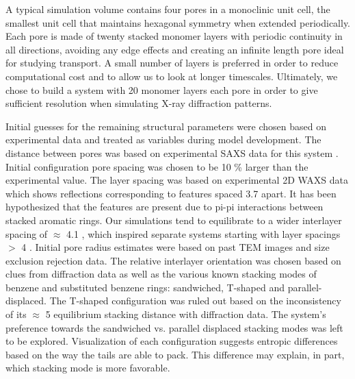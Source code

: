 A typical simulation volume contains four pores in a monoclinic unit cell,
the smallest unit cell that maintains hexagonal symmetry when extended 
periodically. Each pore is made of twenty stacked monomer layers with
periodic continuity in all directions, avoiding any edge effects and 
creating an infinite length pore ideal for studying transport. A small
number of layers is preferred in order to reduce computational cost and 
to allow us to look at longer timescales. Ultimately, we chose to build a system
with 20 monomer layers each pore in order to give sufficient
resolution when simulating X-ray diffraction patterns.  %


Initial guesses for the remaining structural parameters were chosen
based on experimental data and treated as variables during model
development. The distance between pores was based on experimental SAXS
data for this system \cite{feng_thin_2016}. Initial configuration pore
spacing was chosen to be 10 \% larger than the experimental value. 
The layer spacing was based on experimental 2D WAXS data which shows
reflections corresponding to features spaced 3.7 \angstrom apart. It has 
been hypothesized that the features are present due to pi-pi
interactions between stacked aromatic rings\cite{feng_scalable_2014}. 
Our simulations tend to equilibrate to a wider interlayer spacing of $\approx$ 4.1 \angstrom,
which inspired separate systems starting with layer spacings $>$ 4 \angstrom.
Initial pore radius estimates were based on past TEM 
images and size exclusion rejection data\cite{feng_scalable_2014,
feng_thin_2016,zhou_supported_2005}.
The relative interlayer orientation was chosen based on clues from diffraction
data as well as the various known stacking modes of benzene and substituted 
benzene rings: sandwiched, T-shaped and parallel-displaced. The T-shaped configuration was ruled
out based on the inconsistency of its $\approx$ 5 \angstrom equilibrium 
stacking distance with diffraction data. The system's preference
towards the sandwiched vs. parallel displaced stacking modes was left
to be explored. Visualization of each configuration suggests entropic differences 
based on the way the tails are able to pack. This difference may 
explain, in part, which stacking mode is more favorable.

